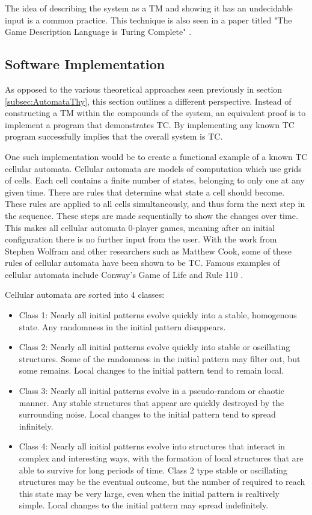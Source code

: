 The idea of describing the system as a TM and showing it has an undecidable input is a common practice.
This technique is also seen in a paper titled "The Game Description Language is Turing Complete" \cite{GDLTC}.

\subsection{Software Implementation}\label{subsec:SoftwareImplementation}

As opposed to the various theoretical approaches seen previously in section \ref{subsec:AutomataThy}, this section outlines a different perspective.
Instead of constructing a TM within the compounds of the system, an equivalent proof is to implement a program that demonstrates TC.
By implementing any known TC program successfully implies that the overall system is TC.

One such implementation would be to create a functional example of a known TC cellular automata.
Cellular automata are models of computation which use grids of cells.
Each cell contains a finite number of states, belonging to only one at any given time.
There are rules that determine what state a cell should become.
These rules are applied to all cells simultaneously, and thus form the next step in the sequence.
These steps are made sequentially to show the changes over time.
This makes all cellular automata 0-player games, meaning after an initial configuration there is no further input from the user.
With the work from Stephen Wolfram and other researchers such as Matthew Cook, some of these rules of cellular automata have been shown to be TC.
Famous examples of cellular automata include Conway's Game of Life and Rule 110 \cite{CellAutWiki,CellAutWolfram}.

Cellular automata are sorted into 4 classes:
\begin{itemize}
    \item Class 1: Nearly all initial patterns evolve quickly into a stable, homogenous state.
    Any randomness in the initial pattern disappears.
    \item Class 2: Nearly all initial patterns evolve quickly into stable or oscillating structures.
    Some of the randomness in the initial pattern may filter out, but some remains.
    Local changes to the initial pattern tend to remain local.
    \item Class 3: Nearly all initial patterns evolve in a pseudo-random or chaotic manner.
    Any stable structures that appear are quickly destroyed by the surrounding noise.
    Local changes to the initial pattern tend to spread infinitely.
    \item Class 4: Nearly all initial patterns evolve into structures that interact in complex and interesting ways, with the formation of local structures that are able to survive for long periods of time.
    Class 2 type stable or oscillating structures may be the eventual outcome, but the number of required to reach this state may be very large, even when the initial pattern is realtively simple.
    Local changes to the initial pattern may spread indefinitely.
\end{itemize}

